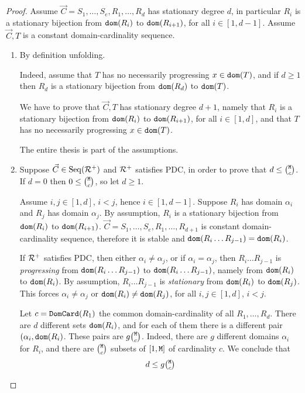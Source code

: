 \documentclass{lmcs}
\begin{document}
\begin{proof}
Assume $\vec{C}= S_1, \ldots, S_e, R_1, \ldots, R_{d}$ has stationary degree $d$,
in particular $R_i$ is a stationary bijection from ${\tt dom}(R_i)$ to ${\tt dom}(R_{i+1})$,
for all $i \in [1,d-1]$. 
Assume $\vec{C}, T$ is a constant domain-cardinality sequence.

\begin{enumerate}
\item
\label{lemma-degree-constant-01}
By definition unfolding.

Indeed, assume that $T$ has no necessarily progressing $x \in {\tt dom}(T)$,
and if $d \ge 1$ then $R_{d}$ is a stationary bijection from ${\tt dom}(R_{d})$ to ${\tt dom}(T)$.

We have to prove that $\vec{C}, T$ has stationary degree $d+1$, namely that
$R_i$ is a stationary bijection from ${\tt dom}(R_i)$ to ${\tt dom}(R_{i+1})$,
 for all $i \in [1,d]$, and that $T$ has no necessarily progressing $x \in {\tt dom}(T)$.
 
 The entire thesis is part of the assumptions.

\item
Suppose $\vec{C} \in {\rm Seq}({\mathcal R}^+)$ and ${\mathcal R}^+$ satisfies PDC, in order to prove
that $d \le \newton{\MaxInd}{c}$. If $d=0$ then $0 \le \newton{\MaxInd}{c}$, 
so let $d \ge 1$.

Assume $i,j \in [1,d]$, $i < j$, hence $i \in [1,d-1]$. Suppose $R_i$ has domain $\alpha_i$ 
and $R_j$ has domain $\alpha_j$. By assumption, $R_i$ is a stationary bijection from 
${\tt dom}(R_i)$ to ${\tt dom}(R_{i+1})$.
$\vec{C} = S_1, \ldots, S_e, R_1, \ldots, R_{d+1}$ is constant domain-cardinality sequence, 
therefore it is stable and ${\tt dom}(R_i \ldots R_{j-1}) = {\tt dom}(R_i)$. 

If ${\mathcal R}^+$ satisfies PDC, then either $\alpha_i \not = \alpha_j$, or
if  $\alpha_i = \alpha_j$, then $R_i \ldots R_{j-1}$ is \emph{progressing} from 
${\tt dom}(R_i \ldots R_{j-1})$ to ${\tt dom}(R_i \ldots R_{j-1})$, namely from  
${\tt dom}(R_i)$ to ${\tt dom}(R_i)$. By assumption, $R_i \ldots R_{j-1}$ is \emph{stationary} 
from  ${\tt dom}(R_i)$ to ${\tt dom}(R_{j})$. This forces $\alpha_i \not = \alpha_j$ or 
${\tt dom}(R_i) \not = {\tt dom}(R_{j})$, for all $i,j \in [1,d]$, $i < j$.

Let $c = {\tt DomCard}(R_{1})$ the common domain-cardinality of all $R_1, \ldots, R_{d}$. 
There are $d$ different sets ${\tt dom}(R_i)$, and for each of them there is
a different pair $(\alpha_i,{\tt dom}(R_i)$. These pairs are $g \newton{\MaxInd}{c}$. Indeed,
there are $g$ different domains $\alpha_i$ for $R_i$, and there are $\newton{\MaxInd}{c}$ 
subsets of $[1,{\tt M}]$ of cardinality $c$. We conclude that
$$
d \le g \newton{\MaxInd}{c}
$$  
\end{enumerate}
\end{proof}
\end{document}
